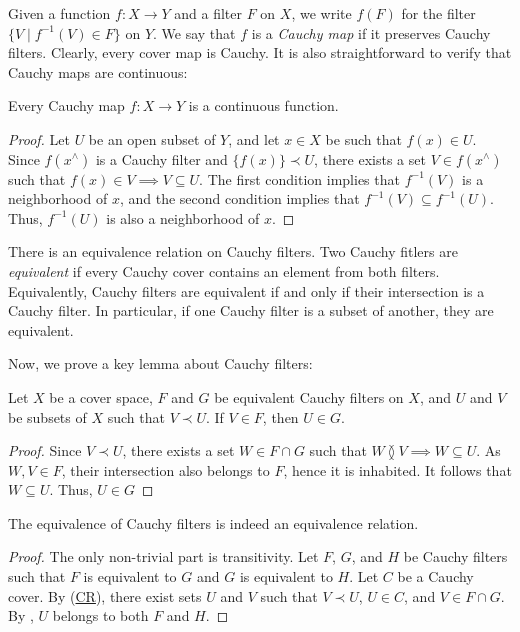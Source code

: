 \documentclass[reqno]{amsart}
\newcommand{\axref}[1]{(\hyperref[ax:#1]{#1})}
\theoremstyle{definition}
\theoremstyle{remark}
\numberwithin{figure}{section}
\newcommand{\overlap}[2]{#1 \between #2}
\newcommand{\rb}{\prec}
\begin{document}
Given a function $f : X \to Y$ and a filter $F$ on $X$, we write $f(F)$ for the filter $\{ V \mid f^{-1}(V) \in F \}$ on $Y$.
We say that $f$ is a \emph{Cauchy map} if it preserves Cauchy filters.
Clearly, every cover map is Cauchy.
It is also straightforward to verify that Cauchy maps are continuous:  

\begin{prop}
Every Cauchy map $f : X \to Y$ is a continuous function.
\end{prop}
\begin{proof}
Let $U$ be an open subset of $Y$, and let $x \in X$ be such that $f(x) \in U$.  
Since $f(x^\wedge)$ is a Cauchy filter and $\{ f(x) \} \rb U$, there exists a set $V \in f(x^\wedge)$ such that $f(x) \in V \implies V \subseteq U$.  
The first condition implies that $f^{-1}(V)$ is a neighborhood of $x$, and the second condition implies that $f^{-1}(V) \subseteq f^{-1}(U)$.
Thus, $f^{-1}(U)$ is also a neighborhood of $x$.
\end{proof}

There is an equivalence relation on Cauchy filters.
Two Cauchy fitlers are \emph{equivalent} if every Cauchy cover contains an element from both filters.
Equivalently, Cauchy filters are equivalent if and only if their intersection is a Cauchy filter.  
In particular, if one Cauchy filter is a subset of another, they are equivalent.

Now, we prove a key lemma about Cauchy filters:

\begin{lem}
Let $X$ be a cover space, $F$ and $G$ be equivalent Cauchy filters on $X$, and $U$ and $V$ be subsets of $X$ such that $V \rb U$.
If $V \in F$, then $U \in G$.  
\end{lem}
\begin{proof}
Since $V \rb U$, there exists a set $W \in F \cap G$ such that $\overlap{W}{V} \implies W \subseteq U$.
As $W,V \in F$, their intersection also belongs to $F$, hence it is inhabited.  
It follows that $W \subseteq U$.
Thus, $U \in G$
\end{proof}

\begin{prop}
The equivalence of Cauchy filters is indeed an equivalence relation.
\end{prop}
\begin{proof}
The only non-trivial part is transitivity.
Let $F$, $G$, and $H$ be Cauchy filters such that $F$ is equivalent to $G$ and $G$ is equivalent to $H$.  
Let $C$ be a Cauchy cover.
By \axref{CR}, there exist sets $U$ and $V$ such that $V \rb U$, $U \in C$, and $V \in F \cap G$.
By , $U$ belongs to both $F$ and $H$.
\end{proof}
\end{document}
